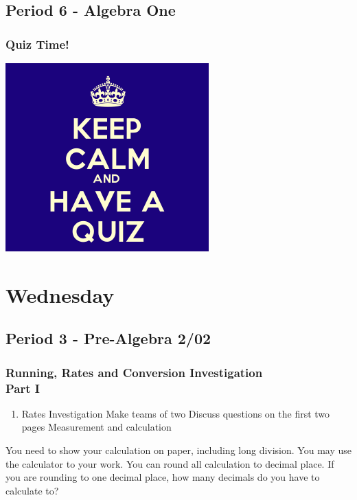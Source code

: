 \subsection[ALG1]{Period 6 - Algebra One}
   	   \begin{frame}[label=ALG1]
   	   \frametitle{Quiz Time!}

           \begin{center}
\includegraphics[width=0.7\linewidth]{Images/keep_calm_have_a_quiz}
\end{center}

   	   \end{frame}

   	 \section[Wed]{Wednesday}
   	 \subsection[PA2/02]{Period 3 - Pre-Algebra 2/02}
      \begin{frame}[label=PA2_02]
       	\frametitle{Running, Rates and Conversion Investigation \\ Part I}

        	\begin{enumerate}
              \item Rates Investigation
               \rightarrowitem Make teams of two 
               \rightarrowitem Discuss questions on the first two pages 
               \rightarrowitem Measurement and calculation
             \end{enumerate}

\begin{alertblock}{}
	You need to show your calculation on paper, including long division. You may use the calculator to  your work.
	You can round all calculation to  decimal place. If you are rounding to one decimal place, how many decimals do you have to calculate to?
\end{alertblock}

      \end{frame}

